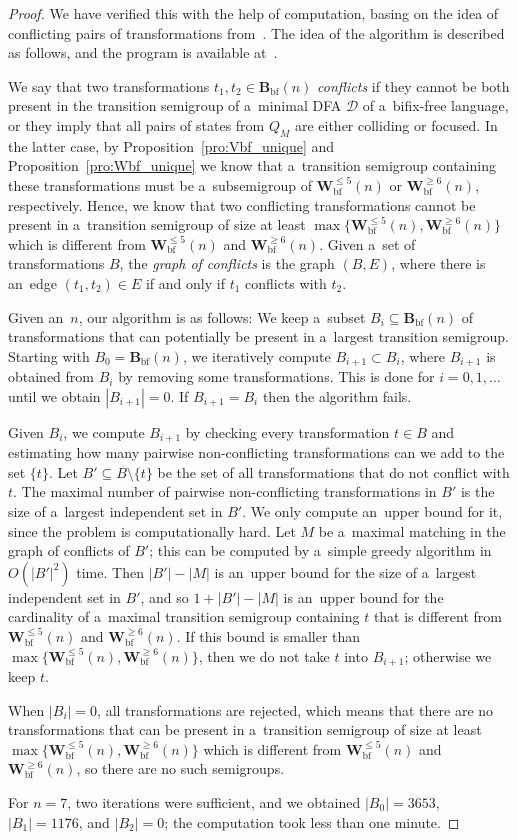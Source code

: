 \documentclass{amsart}
\renewcommand{\le}{\leqslant}
\renewcommand{\ge}{\geqslant}
\newcommand{\Bbf}{\mathbf{B}_{\mathrm{bf}}}
\newcommand{\Vbf}{\mathbf{W}^{\le 5}_{\mathrm{bf}}}
\newcommand{\Wbf}{\mathbf{W}^{\ge 6}_{\mathrm{bf}}}
\newcommand{\cD}{{\mathcal D}}
\begin{document}
\begin{proof}
We have verified this with the help of computation, basing on the idea of conflicting pairs of transformations from~\cite[Theorem~20]{BLY12}.
The idea of the algorithm is described as follows, and the program is available at~\cite{SzWi18SyntacticComplexityOfBifixFreeArxiv}.

We say that two transformations $t_1,t_2 \in \Bbf(n)$ \emph{conflicts} if they cannot be both present in the transition semigroup of a~minimal DFA $\cD$ of a~bifix-free language, or they imply that all pairs of states from $Q_M$ are either colliding or focused.
In the latter case, by Proposition~\ref{pro:Vbf_unique} and Proposition~\ref{pro:Wbf_unique} we know that a~transition semigroup containing these transformations must be a~subsemigroup of $\Vbf(n)$ or $\Wbf(n)$, respectively.
Hence, we know that two conflicting transformations cannot be present in a~transition semigroup of size at least $\max\{\Vbf(n),\Wbf(n)\}$ which is different from $\Vbf(n)$ and $\Wbf(n)$.
Given a~set of transformations $B$, the \emph{graph of conflicts} is the graph $(B,E)$, where there is an~edge $(t_1,t_2) \in E$ if and only if $t_1$ conflicts with $t_2$.

Given an~$n$, our algorithm is as follows:
We keep a~subset $B_i \subseteq \Bbf(n)$ of transformations that can potentially be present in a~largest transition semigroup.
Starting with $B_0=\Bbf(n)$, we iteratively compute $B_{i+1} \subset B_i$, where $B_{i+1}$ is obtained from $B_i$ by removing some transformations.
This is done for $i=0,1,\ldots$ until we obtain $|B_{i+1}| = 0$.
If $B_{i+1} = B_i$ then the algorithm fails.

Given $B_i$, we compute $B_{i+1}$ by checking every transformation $t \in B$ and estimating how many pairwise non-conflicting transformations can we add to the set $\{t\}$.
Let $B' \subseteq B \setminus \{t\}$ be the set of all transformations that do not conflict with $t$.
The maximal number of pairwise non-conflicting transformations in $B'$ is the size of a~largest independent set in $B'$.
We only compute an~upper bound for it, since the problem is computationally hard.
Let $M$ be a~maximal matching in the graph of conflicts of $B'$; this can be computed by a~simple greedy algorithm in $O(|B'|^2)$ time.
Then $|B'|-|M|$ is an~upper bound for the size of a~largest independent set in $B'$, and so $1+|B'|-|M|$ is an~upper bound for the cardinality of a~maximal transition semigroup containing $t$ that is different from $\Vbf(n)$ and $\Wbf(n)$.
If this bound is smaller than $\max\{\Vbf(n),\Wbf(n)\}$, then we do not take $t$ into $B_{i+1}$; otherwise we keep $t$.

When $|B_i| = 0$, all transformations are rejected, which means that there are no transformations that can be present in a~transition semigroup of size at least $\max\{\Vbf(n),\Wbf(n)\}$ which is different from $\Vbf(n)$ and $\Wbf(n)$, so there are no such semigroups.

For $n=7$, two iterations were sufficient, and we obtained $|B_0| = 3653$, $|B_1|=1176$, and $|B_2|=0$; the computation took less than one minute.
\end{proof}
\end{document}
